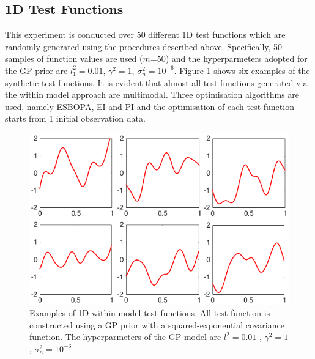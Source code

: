 \documentclass[a4paper,11pt]{report}
\begin{document}
\subsection{1D Test Functions}
This experiment is conducted over 50 different 1D test functions which are randomly generated using the procedures described above. Specifically, 50 samples of function values are used ($m$=50) and the hyperparmeters adopted for the GP prior are  $ l_1^2=0.01$, $\gamma^2=1 $,  $\sigma_n^2= 10^{-6}$. Figure \ref{1Dtestfunctions} shows six examples of the synthetic test functions. It is evident that almost all test functions generated via the within model approach are multimodal. Three optimisation algorithms are used, namely ESBOPA, EI and PI and the optimisation of each test function starts from 1 initial observation data. 
\\
\begin{figure} [H] \label{1Dtestfunctions}
	\centering
	 \includegraphics[width=0.8\linewidth]{1Dtestfunctions.png}
\caption{ Examples of 1D within model test functions. All  test function is constructed using a GP prior with a squared-exponential covariance function. The hyperparmeters of the GP model are  $ l_1^2=0.01$ , $\gamma^2=1 $,  $\sigma_n^2= 10^{-6}$} 
\end{figure}
\end{document}
